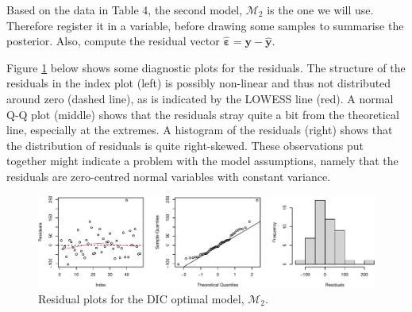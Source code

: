 \documentclass[
]{homework}
\newenvironment{Shaded}{\begin{snugshade}}{\end{snugshade}}
\newcommand{\AttributeTok}[1]{\textcolor[rgb]{0.13,0.29,0.53}{#1}}
\newcommand{\DecValTok}[1]{\textcolor[rgb]{0.00,0.00,0.81}{#1}}
\newcommand{\FunctionTok}[1]{\textcolor[rgb]{0.13,0.29,0.53}{\textbf{#1}}}
\newcommand{\NormalTok}[1]{#1}
\newcommand{\OtherTok}[1]{\textcolor[rgb]{0.56,0.35,0.01}{#1}}
\newcommand{\SpecialCharTok}[1]{\textcolor[rgb]{0.81,0.36,0.00}{\textbf{#1}}}
\newcommand{\StringTok}[1]{\textcolor[rgb]{0.31,0.60,0.02}{#1}}
\begin{document}
Based on the data in Table 4, the second model, \(\mathcal M_2\) is the one we will use. Therefore register it in a variable, before drawing some samples to summarise the posterior. Also, compute the residual vector \(\hat{\boldsymbol\varepsilon} = \mathbf y - \hat{\mathbf y}\).

\begin{Shaded}
\end{Shaded}

Figure \ref{fig:ex4-resid-plots} below shows some diagnostic plots for the residuals. The structure of the residuals
in the index plot (left) is possibly non-linear and thus not distributed around zero (dashed line), as is indicated by the LOWESS line (red).
A normal Q-Q plot (middle) shows that the residuals stray quite a bit from the theoretical line, especially at the extremes. A histogram of the
residuals (right) shows that the distribution of residuals is quite right-skewed. These observations put together might indicate a problem with the model assumptions, namely that the residuals are zero-centred normal variables with constant variance.

\begin{figure}

{\centering \includegraphics[width=1\linewidth]{finalexam_files/figure-latex/ex4-resid-plots-1} 

}

\caption{Residual plots for the DIC optimal model, $\mathcal M_2$.}\label{fig:ex4-resid-plots}
\end{figure}
\end{document}
